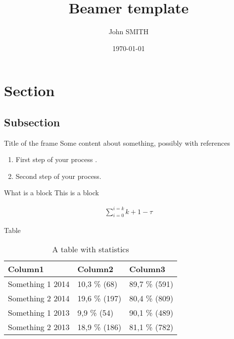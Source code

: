 \documentclass[mathserif]{beamer}
\begin{document}
\title[Template]{Beamer template}
\author{John SMITH}

\date{\today}
\subject{Computer Science}

\frame[plain]{\titlepage}


\section{Section}
\subsection{Subsection}

\begin{frame}{Title of the frame}
    Some content about something, possibly with references \cite{REFERENCE}
    \begin{enumerate}
        \item First step of your process \footnotemark[1].
        \item Second step of your process.
    \end{enumerate}

    \begin{block}{What is a block}
        This is a block 
    \end{block}

    \begin{align*}
        \sum_{i=0}^{i=k}k+1 - \tau
    \end{align*}

\end{frame}

\begin{frame}{Table}
\begin{table}[ht]
\caption{A table with statistics}
\centering
\fontsize{10pt}{15pt}\selectfont
   \begin{tabularx}{\textwidth}{X|X|X}
      \textbf{Column1} & \textbf{Column2} & \textbf{Column3} \\
      \hline\hline
      Something 1 2014 & 10,3 \% (68) & 89,7 \% (591)\\
      Something 2 2014 & 19,6 \% (197) & 80,4 \% (809)\\
      Something 1 2013 & 9,9 \% (54) & 90,1 \% (489)\\
      Something 2 2013 & 18,9 \% (186) & 81,1 \% (782)\\
   \hline\hline
   \end{tabularx}
\end{table}

\end{frame}
\end{document}
